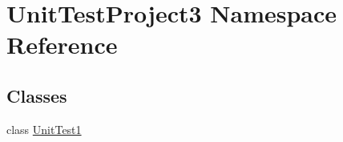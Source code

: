 \hypertarget{namespace_unit_test_project3}{}\section{Unit\+Test\+Project3 Namespace Reference}
\label{namespace_unit_test_project3}
\subsection*{Classes}
\begin{DoxyCompactItemize}
\item 
class \hyperlink{class_unit_test_project3_1_1_unit_test1}{Unit\+Test1}
\end{DoxyCompactItemize}
